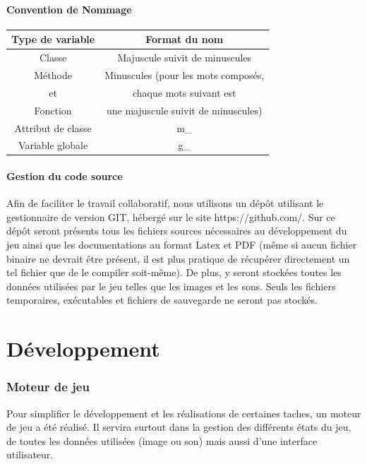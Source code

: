 \documentclass[a4paper]{article}
\newcommand{\alinea}{\hspace*{0.5cm}}
\begin{document}
      \subsection{Convention de Nommage}
        \begin{small}
          \begin{tabular}{| c | c |}
            \hline
            \textbf{Type de variable} & \textbf{Format du nom}\\
            \hline
            Classe & Majuscule suivit de minuscules\\
            \hline
            Méthode & Minuscules (pour les mots composés,\\
            et & chaque mots suivant est\\
            Fonction & une majuscule suivit de minuscules)\\
            \hline
            Attribut de classe & m\_\\
            \hline
            Variable globale & g\_\\
            \hline
          \end{tabular}
        \end{small}

      \subsection{Gestion du code source}
        \alinea Afin de faciliter le travail collaboratif, nous utilisons un dépôt utilisant le gestionnaire de version GIT, hébergé sur le site https://github.com/. Sur ce dépôt seront présents tous les fichiers sources nécessaires au développement du jeu ainsi que les documentations au format Latex et PDF (même si aucun fichier binaire ne devrait être présent, il est plus pratique de récupérer directement un tel fichier que de le compiler soit-même). De plus, y seront stockées toutes les données utilisées par le jeu telles que les images et les sons. Seuls les fichiers temporaires, exécutables et fichiers de sauvegarde ne seront pas stockés.
		

  \newpage
  \part{Développement}
    
	\section{Moteur de jeu}
		Pour simplifier le développement et les réalisations de certaines taches, un moteur de jeu a été réalisé. Il servira surtout dans la gestion des différents états du jeu, de toutes les données utilisées (image ou son) mais aussi d'une interface utilisateur.
	
\end{document}
